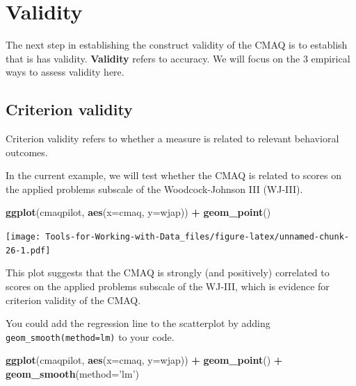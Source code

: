 \documentclass[
]{book}
\newenvironment{Shaded}{\begin{snugshade}}{\end{snugshade}}
\newcommand{\DataTypeTok}[1]{\textcolor[rgb]{0.13,0.29,0.53}{#1}}
\newcommand{\KeywordTok}[1]{\textcolor[rgb]{0.13,0.29,0.53}{\textbf{#1}}}
\newcommand{\NormalTok}[1]{#1}
\newcommand{\OperatorTok}[1]{\textcolor[rgb]{0.81,0.36,0.00}{\textbf{#1}}}
\newcommand{\StringTok}[1]{\textcolor[rgb]{0.31,0.60,0.02}{#1}}
\begin{document}
\hypertarget{validity}{%
\section{Validity}\label{validity}}

The next step in establishing the construct validity of the CMAQ is to establish that is has validity. \textbf{Validity} refers to accuracy. We will focus on the 3 empirical ways to assess validity here.

\hypertarget{criterion-validity}{%
\subsection{Criterion validity}\label{criterion-validity}}

Criterion validity refers to whether a measure is related to relevant behavioral outcomes.

In the current example, we will test whether the CMAQ is related to scores on the applied problems subscale of the Woodcock-Johnson III (WJ-III).

\begin{Shaded}
\begin{Highlighting}[]
\KeywordTok{ggplot}\NormalTok{(cmaqpilot, }\KeywordTok{aes}\NormalTok{(}\DataTypeTok{x=}\NormalTok{cmaq, }\DataTypeTok{y=}\NormalTok{wjap)) }\OperatorTok{+}
\StringTok{  }\KeywordTok{geom_point}\NormalTok{() }
\end{Highlighting}
\end{Shaded}

\texttt{[image: Tools-for-Working-with-Data\_files/figure-latex/unnamed-chunk-26-1.pdf]}

This plot suggests that the CMAQ is strongly (and positively) correlated to scores on the applied problems subscale of the WJ-III, which is evidence for criterion validity of the CMAQ.

You could add the regression line to the scatterplot by adding \texttt{geom\_smooth(method=\textquotesingle{}lm\textquotesingle{})} to your code.

\begin{Shaded}
\begin{Highlighting}[]
\KeywordTok{ggplot}\NormalTok{(cmaqpilot, }\KeywordTok{aes}\NormalTok{(}\DataTypeTok{x=}\NormalTok{cmaq, }\DataTypeTok{y=}\NormalTok{wjap)) }\OperatorTok{+}
\StringTok{  }\KeywordTok{geom_point}\NormalTok{() }\OperatorTok{+}
\StringTok{  }\KeywordTok{geom_smooth}\NormalTok{(}\DataTypeTok{method=}\StringTok{'lm'}\NormalTok{)}
\end{Highlighting}
\end{Shaded}
\end{document}
